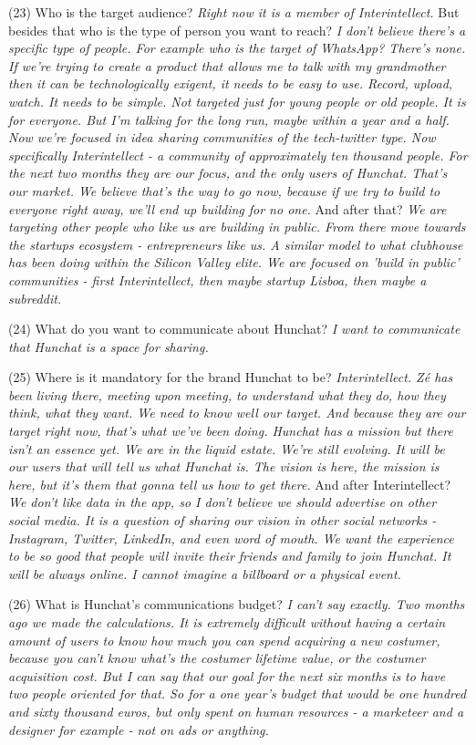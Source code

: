 \documentclass[11pt]{article}
\begin{document}
(23) Who is the target audience? \textit{Right now it is a member of Interintellect.} But besides that who is the type of person you want to reach? \textit{I don't believe there's a specific type of people. For example who is the target of WhatsApp? There's none. If we're trying to create a product that allows me to talk with my grandmother then it can be technologically exigent, it needs to be easy to use. Record, upload, watch. It needs to be simple. Not targeted just for young people or old people. It is for everyone. But I'm talking for the long run, maybe within a year and a half. Now we're focused in idea sharing communities of the tech-twitter type. Now specifically Interintellect - a community of approximately ten thousand people. For the next two months they are our focus, and the only users of Hunchat. That's our market. We believe that's the way to go now, because if we try to build to everyone right away, we'll end up building for no one.} And after that? \textit{We are targeting other people who like us are building in public. From there move towards the startups ecosystem - entrepreneurs like us. A similar model to what clubhouse has been doing within the Silicon Valley elite. We are focused on 'build in public' communities - first Interintellect, then maybe startup Lisboa, then maybe a subreddit.}

(24) What do you want to communicate about Hunchat? \textit{I want to communicate that Hunchat is a space for sharing.}

(25) Where is it mandatory for the brand Hunchat to be? \textit{Interintellect. Zé has been living there, meeting upon meeting, to understand what they do, how they think, what they want. We need to know well our target. And because they are our target right now, that's what we've been doing. Hunchat has a mission but there isn't an essence yet. We are in the liquid estate. We're still evolving. It will be our users that will tell us what Hunchat is. The vision is here, the mission is here, but it's them that gonna tell us how to get there.} And after Interintellect? \textit{We don't like data in the app, so I don't believe we should advertise on other social media. It is a question of sharing our vision in other social networks - Instagram, Twitter, LinkedIn, and even word of mouth. We want the experience to be so good that people will invite their friends and family to join Hunchat. It will be always online. I cannot imagine a billboard or a physical event.}

(26) What is Hunchat’s communications budget? \textit{I can't say exactly. Two months ago we made the calculations. It is extremely difficult without having a certain amount of users to know how much you can spend acquiring a new costumer, because you can't know what's the costumer lifetime value, or the costumer acquisition cost. But I can say that our goal for the next six months is to have two people oriented for that. So for a one year's budget that would be one hundred and sixty thousand euros, but only spent on human resources - a marketeer and a designer for example - not on ads or anything.}
\end{document}
